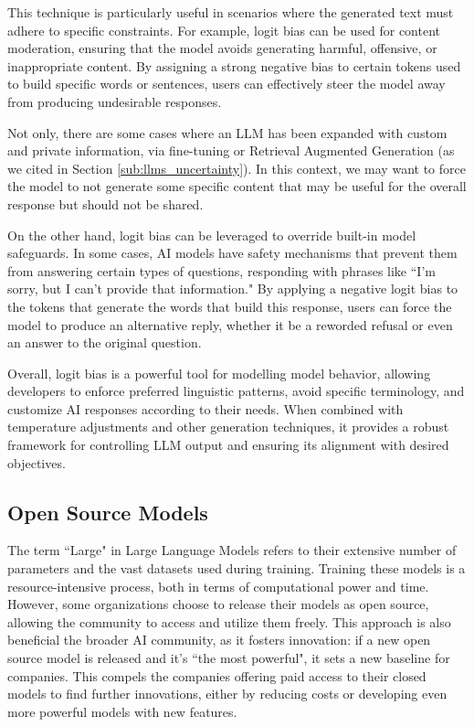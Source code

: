 This technique is particularly useful in scenarios where the generated text must
adhere to specific constraints. For example, logit bias can be used for content
moderation, ensuring that the model avoids generating harmful, offensive, or inappropriate
content. By assigning a strong negative bias to certain tokens used to build
specific words or sentences, users can effectively steer the model away from producing
undesirable responses.

Not only, there are some cases where an LLM has been expanded with custom and
private information, via fine-tuning or Retrieval Augmented Generation (as we
cited in Section \ref{sub:llms_uncertainty}). In this context, we may want to force
the model to not generate some specific content that may be useful for the overall
response but should not be shared.

On the other hand, logit bias can be leveraged to override built-in model
safeguards. In some cases, AI models have safety mechanisms that prevent them
from answering certain types of questions, responding with phrases like ``I'm sorry,
but I can't provide that information." By applying a negative logit bias to the
tokens that generate the words that build this response, users can force the model
to produce an alternative reply, whether it be a reworded refusal or even an
answer to the original question.

Overall, logit bias is a powerful tool for modelling model behavior, allowing
developers to enforce preferred linguistic patterns, avoid specific terminology,
and customize AI responses according to their needs. When combined with temperature
adjustments and other generation techniques, it provides a robust framework for
controlling LLM output and ensuring its alignment with desired objectives.

\subsection{Open Source Models}

The term ``Large" in Large Language Models refers to their extensive number of
parameters and the vast datasets used during training. Training these models is a
resource-intensive process, both in terms of computational power and time. However,
some organizations choose to release their models as open source, allowing the community
to access and utilize them freely. This approach is also beneficial the broader
AI community, as it fosters innovation: if a new open source model is released
and it's ``the most powerful", it sets a new baseline for companies. This compels
the companies offering paid access to their closed models to find further innovations,
either by reducing costs or developing even more powerful models with new
features.


